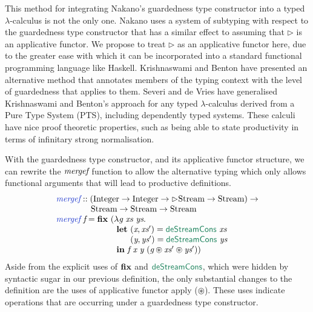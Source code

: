 This method for integrating Nakano's guardedness type constructor into
a typed $\lambda$-calculus is not the only one.  Nakano uses a system
of subtyping with respect to the guardedness type constructor that has
a similar effect to assuming that $\rhd$ is an applicative functor. We
propose to treat $\rhd$ as an applicative functor here, due to the greater
ease with which it can be incorporated into a standard functional
programming language like Haskell. Krishnaswami and Benton
\cite{krishnaswami11semantic,krishnaswami11ultrametric} have presented
an alternative method that annotates members of the typing context
with the level of guardedness that applies to them. Severi and de
Vries \cite{severi12pure} have generalised Krishnaswami and Benton's
approach for any typed $\lambda$-calculus derived from a Pure Type
System (PTS), including dependently typed systems. These calculi have
nice proof theoretic properties, such as being able to state
productivity in terms of infinitary strong normalisation.

With the guardedness type constructor, and its applicative functor
structure, we can rewrite the $\textit{mergef}$ function to allow the
alternative typing which only allows functional arguments that will
lead to productive definitions.
\begin{displaymath}
  \begin{array}{l}
    \defn{mergef} :: (\tyname{Integer} \to \tyname{Integer} \to \rhd\tyname{Stream} \to \tyname{Stream}) \to \\
    \textcolor{white}{\textrm{mergef} :: }\ \tyname{Stream} \to \tyname{Stream} \to \tyname{Stream} \\
    \defn{mergef}\ \ident{f} = \kw{fix}\ (\lambda \ident{g}\ \ident{xs}\ \ident{ys}. \\
    \hspace{2.5cm} \kw{let}\ (\ident{x}, \ident{xs$'$}) = \elim{deStreamCons}\ \ident{xs} \\
    \hspace{2.5cm} \textcolor{white}{\kw{let}\ }(\ident{y}, \ident{ys$'$}) = \elim{deStreamCons}\ \ident{ys} \\
    \hspace{2.5cm} \kw{in}\ \ident{f}\ \ident{x}\ \ident{y}\ (\ident{g} \circledast \ident{xs$'$} \circledast \ident{ys$'$}))
  \end{array}
\end{displaymath}
Aside from the explicit uses of $\textbf{fix}$ and $\elim{deStreamCons}$,
which were hidden by syntactic sugar in our previous definition, the
only substantial changes to the definition are the uses of applicative
functor apply ($\circledast$). These uses indicate operations that are
occurring under a guardedness type constructor.

